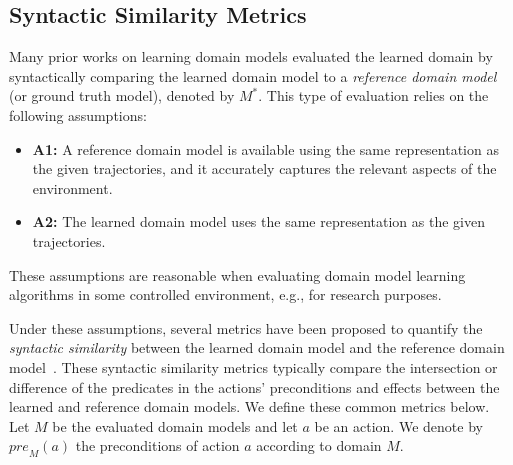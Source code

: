 \documentclass{article}
\theoremstyle{definition}
\theoremstyle{remark}
\newcommand{\realm}{{\ensuremath{M^*}}\xspace}
\newcommand{\pre}{\ensuremath{\textit{pre}}\xspace}
\newif\ifaddcomments
\newcommand{\roni}[1]{\ifaddcomments{\textcolor{red}{[Roni: #1]}}\fi}
\newcommand{\cm}[1]{\ifaddcomments{\textcolor{olive}{[Christian: #1]}}\fi}
\begin{document}
\subsection{Syntactic Similarity Metrics}
Many prior works on learning domain models evaluated the learned domain by syntactically comparing the learned domain model to a \emph{reference domain model} (or ground truth model), denoted by $\realm$. This type of evaluation relies on the following assumptions:
\begin{itemize}
    \item \textbf{A1:} A reference domain model 
    is available using the same representation as the given trajectories, and it accurately captures the relevant aspects of the environment. 
    \item \textbf{A2:} The learned domain model uses the same representation as the given trajectories. 
\end{itemize}
These assumptions are reasonable when evaluating domain model learning algorithms in some controlled environment, e.g., for research purposes. 



Under these assumptions, several metrics have been proposed to quantify the \emph{syntactic similarity} between the learned domain model and the reference domain model~\citep{aineto2019learning,mordoch2023safe,xi2024neuro,Oswald2024DLLMDomainModeling}.
These syntactic similarity metrics typically compare the intersection or difference of the predicates in the actions' preconditions and effects between the learned and reference domain models. We define these common metrics below. 
Let $M$ be the evaluated domain models and let $a$ be an action. We denote by $\pre_M(a)$ the preconditions of action $a$ according to domain $M$.

\end{document}
